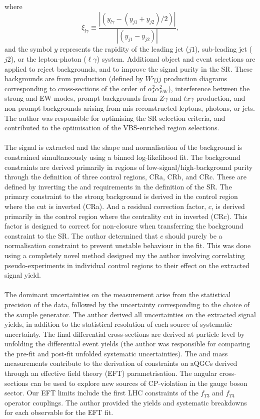 \documentclass{thesissummary}
\begin{document}
where 
\begin{equation} 
    \xi_{l\gamma}\equiv\frac{|(y_{l\gamma}-(y_{j1}+y_{j2})/2)|}{|(y_{j1}-y_{j2})|},
\end{equation}
and the symbol $y$ represents the rapidity of the leading jet ($j1$), sub-leading jet ($j2$), or the lepton-photon ($\ell\gamma$) system.
Additional object and event selections are applied to reject backgrounds, and to improve the signal purity in the SR. These backgrounds are from \qcdwy production (defined by $W\gamma jj$ production diagrams corresponding to cross-sections of the order of $\alpha_s^2\alpha_{EW}^2$), interference between the strong and EW \wyjj modes, prompt backgrounds from $Z\gamma$ and $tx\gamma$ production, and non-prompt backgrounds arising from mis-reconstructed leptons, photons, or jets. The author was responsible for optimising the SR selection criteria, and contributed to the optimisation of the VBS-enriched region selections.
\\\\
The signal is extracted and the shape and normalisation of the background is constrained simultaneously using a binned log-likelihood fit. The background constraints are derived primarily in regions of low-signal/high-background purity through the definition of three control regions, CRa, CRb, and CRc. These are defined by inverting the \xily and \ngapjet requirements in the definition of the SR. The primary constraint to the strong background is derived in the control region where the \ngapjet cut is inverted (CRa). And a residual correction factor, $c$, is derived primarily in the control region where the centrality cut in inverted (CRc). This factor is designed to correct for non-closure when transferring the background constraint to the SR. The author determined that $c$ should purely be a normalisation constraint to prevent unstable behaviour in the fit. This was done using a completely novel method designed my the author involving correlating pseudo-experiments in individual control regions to their effect on the extracted signal yield.
\\\\
The dominant uncertainties on the measurement arise from the statistical precision of the data, followed by the uncertainty corresponding to the choice of the \qcdwy sample generator. The author derived all uncertainties on the extracted signal yields, in addition to the statistical resolution of each source of systematic uncertainty. The final differential cross-sections are derived at particle level by unfolding the differential event yields (the author was responsible for comparing the pre-fit and post-fit unfolded systematic uncertainties). The \pt and mass measurements contribute to the derivation of constraints on aQGCs derived through an effective field theory (EFT) parametrisation. The angular cross-sections can be used to explore new sources of CP-violation in the gauge boson sector. Our EFT limits include the first LHC constraints of the $f_{T3}$ and $f_{T4}$ operator couplings. The author provided the yields and systematic breakdowns for each observable for the EFT fit.
\end{document}
